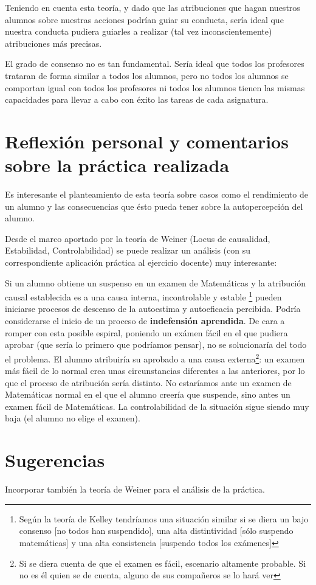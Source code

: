 \documentclass[palatino,nochap]{apuntesURJC}
\begin{document}
Teniendo en cuenta esta teoría, y dado que las atribuciones que hagan nuestros alumnos sobre nuestras acciones podrían guiar su conducta, sería ideal que nuestra conducta pudiera guiarles a realizar (tal vez inconscientemente) atribuciones más precisas.

El grado de consenso no es tan fundamental. 
%
Sería ideal que todos los profesores trataran de forma similar a todos los alumnos, pero no todos los alumnos se comportan igual con todos los profesores ni todos los alumnos tienen las mismas capacidades para llevar a cabo con éxito las tareas de cada asignatura. 

\section{Reflexión personal y comentarios sobre la práctica realizada}

Es interesante el planteamiento de esta teoría sobre casos como el rendimiento de un alumno y las consecuencias que ésto pueda tener sobre la autopercepción del alumno.

Desde el marco aportado por la teoría de Weiner (Locus de causalidad, Estabilidad, Controlabilidad) se puede realizar un análisis (con su correspondiente aplicación práctica al ejercicio docente) muy interesante:

Si un alumno obtiene un suspenso en un examen de Matemáticas y la atribución causal establecida es a una causa interna, incontrolable y estable \footnote{Según la teoría de Kelley tendríamos una situación similar si se diera un bajo consenso [no todos han suspendido], una alta distintividad [sólo suspendo matemáticas] y una alta consistencia [suspendo todos los exámenes]} pueden iniciarse procesos de descenso de la autoestima y autoeficacia percibida.
%
Podría considerarse el inicio de un proceso de \textbf{indefensión aprendida}.
%
De cara a romper con esta posible espiral, poniendo un exámen fácil en el que pudiera aprobar (que sería lo primero que podríamos pensar),  no se solucionaría del todo el problema.
%
El alumno atribuiría su aprobado a una causa externa\footnote{Si se diera cuenta de que el examen es fácil, escenario altamente probable. Si no es él quien se de cuenta, alguno de sus compañeros se lo hará ver}: un examen más fácil de lo normal crea unas circunstancias diferentes a las anteriores, por lo que el proceso de atribución sería distinto. 
%
No estaríamos ante un examen de Matemáticas normal en el que el alumno creería que suspende, sino antes un examen fácil de Matemáticas.
%
La controlabilidad de la situación sigue siendo muy baja (el alumno no elige el examen).


\section{Sugerencias}

Incorporar también la teoría de Weiner para el análisis de la práctica.



  
\label{bibliografia}

\printindex
\end{document}
